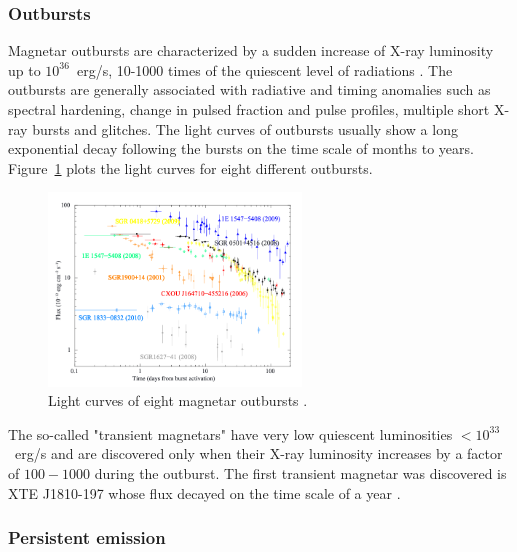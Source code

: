 \subsubsection{Outbursts}

Magnetar outbursts are characterized by a sudden increase of X-ray luminosity up to $10^{36}$~erg/s, 10-1000 times of the quiescent level of radiations \citep{2004ApJ...609L..21I,2004ApJ...605..368G,2008A&ARv..15..225M,2011ASSP...21..247R}.
The outbursts are generally associated with radiative and timing anomalies such as spectral hardening, change in pulsed fraction and pulse profiles, multiple short X-ray bursts and glitches.
The light curves of outbursts usually show a long exponential decay following the bursts on the time scale of months to years. 
Figure~\ref{fig:outburst-light-curve} plots the light curves for eight different outbursts.
%
\begin{figure}[h]
  \centering
  \includegraphics[width=0.6\textwidth]{pics/intro/outbursts.png}
  \caption[Light curves of eight magnetar outbursts]{Light curves of eight magnetar outbursts \citep{2011ASSP...21..247R}.}
  \label{fig:outburst-light-curve}
\end{figure}
%

The so-called "transient magnetars" have very low quiescent luminosities $<10^{33}$~erg/s and are discovered only when their X-ray luminosity increases by a factor of $100-1000$ during the outburst.
The first transient magnetar was discovered is XTE J1810-197 \citep{2004ApJ...609L..21I} whose flux decayed on the time scale of a year \citep{2007Ap&SS.308...79G}.

\subsubsection{Persistent emission}

